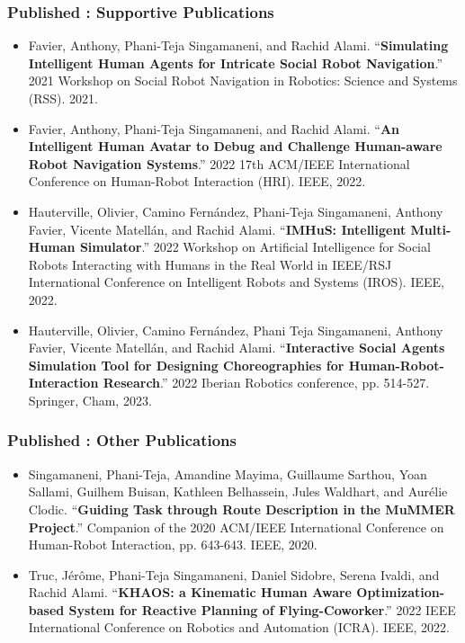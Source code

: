 \subsubsection*{Published : Supportive Publications}
\begin{itemize}

\item Favier, Anthony, Phani-Teja Singamaneni, and Rachid Alami. ``\textbf{Simulating Intelligent Human Agents for Intricate Social Robot Navigation}.'' 2021 Workshop on Social Robot Navigation in Robotics: Science and Systems (RSS). 2021.

\item Favier, Anthony, Phani-Teja Singamaneni, and Rachid Alami. ``\textbf{An Intelligent Human Avatar to Debug and Challenge Human-aware Robot Navigation Systems}.'' 2022 17th ACM/IEEE International Conference on Human-Robot Interaction (HRI). IEEE, 2022.

\item Hauterville, Olivier, Camino Fernández, Phani-Teja Singamaneni, Anthony Favier, Vicente Matellán, and Rachid Alami. ``\textbf{IMHuS: Intelligent Multi-Human Simulator}.'' 2022 Workshop on Artificial Intelligence for Social Robots Interacting with Humans in the Real World in IEEE/RSJ International Conference on Intelligent Robots and Systems (IROS). IEEE, 2022.

\item Hauterville, Olivier, Camino Fernández, Phani Teja Singamaneni, Anthony Favier, Vicente Matellán, and Rachid Alami. ``\textbf{Interactive Social Agents Simulation Tool for Designing Choreographies for Human-Robot-Interaction Research}.'' 2022 Iberian Robotics conference, pp. 514-527. Springer, Cham, 2023.

\end{itemize}

\subsubsection*{Published : Other Publications}
\begin{itemize}

\item Singamaneni, Phani-Teja, Amandine Mayima, Guillaume Sarthou, Yoan Sallami, Guilhem Buisan, Kathleen Belhassein, Jules Waldhart, and Aurélie Clodic. ``\textbf{Guiding Task through Route Description in the MuMMER Project}.'' Companion of the 2020 ACM/IEEE International Conference on Human-Robot Interaction, pp. 643-643. IEEE, 2020.

\item Truc, Jérôme, Phani-Teja Singamaneni, Daniel Sidobre, Serena Ivaldi, and Rachid Alami. ``\textbf{KHAOS: a Kinematic Human Aware Optimization-based System for Reactive Planning of Flying-Coworker}.'' 2022 IEEE International Conference on Robotics and Automation (ICRA). IEEE, 2022.
\end{itemize}

